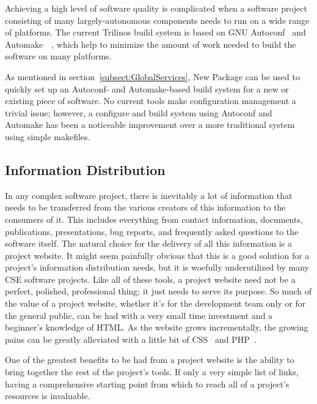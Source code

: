 \documentclass[12pt,relax]{article}
\begin{document}

Achieving a high level of software quality is complicated when a software
project consisting of many largely-autonomous components needs to run on a
wide range of platforms.  The current Trilinos build system is based on GNU
Autoconf~\cite{Autoconf} and Automake~\cite{Automake}~\cite{GoatBook}, which
help to minimize the amount of work needed to build the software on many
platforms.

As mentioned in section~\ref{subsect:GlobalServices}, New Package can be used 
to quickly set up an Autoconf- and Automake-based build system for a new or 
existing piece of software.  No current tools make configuration management 
a trivial issue; however, a configure and build system using Autoconf and
Automake has been a noticeable improvement over a more traditional system using
simple makefiles.

\subsection{Information Distribution}


In any complex software project, there is inevitably a lot of information that
needs to be transferred from the various creators of this information to the
consumers of it.  This includes everything from contact information,
documents, publications, presentations, bug reports, and frequently asked
questions to the software itself.  The natural choice for the delivery of all
this information is a project website.  It might seem painfully obvious that
this is a good solution for a project's information distribution needs, but it
is woefully underutilized by many CSE software projects.  Like all of these
tools, a project website need not be a perfect, polished, professional
thing; it just needs to serve its purpose.  So much of the value of a project
website, whether it's for the development team only or for the general
public, can be had with a very small time investment and a beginner's
knowledge of HTML.  As the website grows incrementally, the growing pains can
be greatly alleviated with a little bit of CSS~\cite{CSS} and PHP~\cite{PHP}.

One of the greatest benefits to be had from a project website is the ability to
bring together the rest of the project's tools.  If only a very simple list of
links, having a comprehensive starting point from which to reach all of a
project's resources is invaluable.
\end{document}
